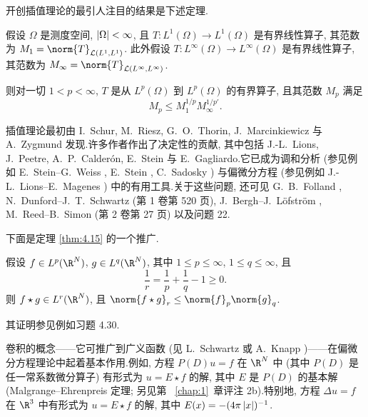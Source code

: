 开创插值理论的最引人注目的结果是下述定理.

\begin{theorem}
\label{thm:4.32}
假设 $\Omega$ 是测度空间, $\left|\Omega\right|<\infty$, 且 $T:L^1(\Omega)\to
L^1(\Omega)$ 是有界线性算子, 其范数为 $M_1=\norm{T}_{\mathcal{L}(L^1,L^1)}$.
此外假设 $T:L^\infty(\Omega)\to L^\infty(\Omega)$ 是有界线性算子, 其范数为
$M_\infty=\norm{T}_{\mathcal{L}(L^\infty,L^\infty)}$.

则对一切 $1<p<\infty$, $T$ 是从 $L^p(\Omega)$ 到 $L^p(\Omega)$ 的有界算子,
且其范数 $M_p$ 满足
\begin{equation*}
M_p\le M_1^{1/p}M_\infty^{1/p'}.
\end{equation*}
\end{theorem}

插值理论最初由 I.~Schur, M.~Riesz, G.~O.~Thorin, J.~Marcinkiewicz 与
A.~Zygmund 发现.许多作者作出了决定性的贡献, 其中包括 J.-L.~Lions, J.~Peetre, A.~P.~Calder\'on, E.~Stein 与 E.~Gagliardo.它已成为调和分析
(参见例如 E.~Stein--G.~Weiss , E.~Stein , C.~Sadosky ) 与偏微分方程 (参见例如
J.-L.~Lions--E.~Magenes ) 中的有用工具.关于这些问题,
还可见 G.~B.~Folland , N.~Dunford--J.~T.~Schwartz
 (第 1 卷第 520 页), J.~Bergh--J.~L\"ofstr\"om
, M.~Reed--B.~Simon  (第 2 卷第 27
页) 以及问题 22.

下面是定理  \ref{thm:4.15} 的一个推广.

\begin{theorem}[Young]
\label{thm:4.33}
假设 $f\in L^p(\R^N)$, $g\in L^q(\R^N)$, 其中 $1\le p\le\infty$,
$1\le q\le\infty$, 且
\begin{equation*}
\frac1r=\frac1p+\frac1q-1\ge0.
\end{equation*}
则 $f\star g\in L^r(\R^N)$, 且 $\norm{f\star g}_r\le\norm{f}_p\norm{g}_q$.
\end{theorem}

其证明参见例如习题 4.30.

卷积的概念——它可推广到广义函数 (见 L.~Schwartz  或
A.~Knapp )——在偏微分方程理论中起着基本作用.例如, 方程
$P(D)u=f$ 在 $\R^N$ 中 (其中 $P(D)$ 是任一常系数微分算子) 有形式为
$u=E\star f$ 的解, 其中 $E$ 是 $P(D)$ 的基本解 (Malgrange--Ehrenpreis 定理;
另见第~
\ref{chap:1}~章评注 2b).特别地, 方程 $\Delta u=f$ 在 $\R^3$ 中有形式为
$u=E\star f$ 的解, 其中 $E(x)=-(4\pi\left|x\right|)^{-1}$.

